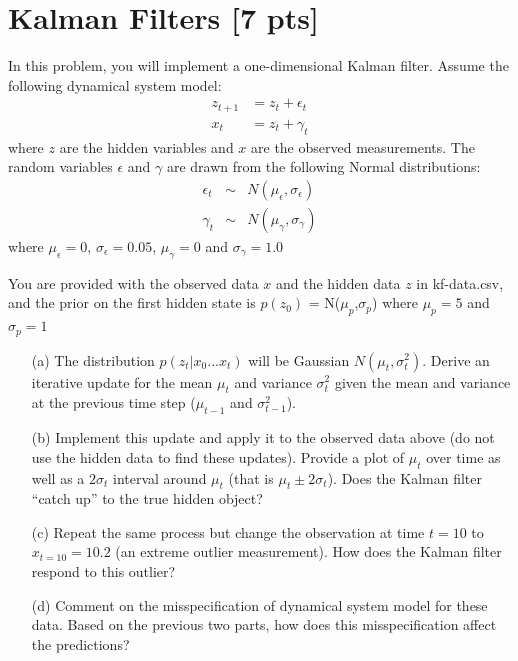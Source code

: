 \documentclass[submit]{harvardml}
\newcommand{\mueps}{\mu_{\epsilon}}
\newcommand{\sigeps}{\sigma_{\epsilon}}
\newcommand{\mugam}{\mu_{\gamma}}
\newcommand{\siggam}{\sigma_{\gamma}}
\newcommand{\muzp}{\mu_{p}}
\newcommand{\sigzp}{\sigma_{p}}
\begin{document}
\newpage

\section*{Kalman Filters [7 pts]}

\begin{problem}
  In this problem, you will implement a one-dimensional Kalman filter.
  Assume the following dynamical system model:
  \begin{eqnarray*}
    z_{t+1} &= z_{t} + \epsilon_{t} \\
    x_{t} & = z_{t} + \gamma_{t}
  \end{eqnarray*}
  where $z$ are the hidden variables and $x$ are the observed
  measurements.  The random variables $\epsilon$ and $\gamma$ are
  drawn from the following Normal distributions:
  \begin{eqnarray*}
    \epsilon_t &\sim& N(\mueps,\sigeps) \\
    \gamma_t &\sim& N(\mugam,\siggam)
  \end{eqnarray*}
  where $\mueps = 0$, $\sigeps=0.05$, $\mugam = 0$ and $\siggam=1.0$

  You are provided with the observed data $x$ and the hidden data $z$ in
  kf-data.csv, and the prior on the first hidden state is $p(z_0)$ =
  N($\muzp$,$\sigzp$) where $\muzp = 5$ and $\sigzp=1$


    \begin{itemize}
      \item[(a)] The distribution $p(z_t|x_0...x_t)$ will be Gaussian
          $N(\mu_t,\sigma^2_t)$. Derive an iterative update for the mean
          $\mu_t$ and variance $\sigma^2_t$ given the mean and variance at the
          previous time step ($\mu_{t-1}$ and  $\sigma^2_{t-1}$).

       \item[(b)] Implement this update and apply it to the observed data above
           (do not use the hidden data to find these updates). Provide a plot
           of $\mu_t$ over time as well as a $2\sigma_t$ interval around
           $\mu_t$ (that is $\mu_t \pm 2\sigma_t$).  Does the Kalman filter
           ``catch up'' to the true hidden object?

       \item[(c)] Repeat the same process but change the observation at time
           $t=10$ to $x_{t=10}=10.2$ (an extreme outlier measurement).  How
           does the Kalman filter respond to this outlier?

       \item[(d)] Comment on the misspecification of dynamical system model for
           these data.  Based on the previous two parts, how does this
           misspecification affect the predictions?

\end{itemize}
\end{problem}
\end{document}
